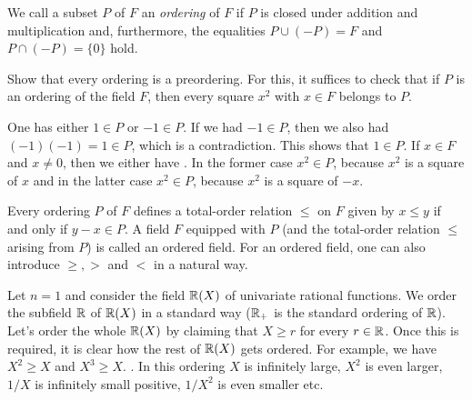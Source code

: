 We call a subset $P$ of $F$ an \emph{ordering} of $F$ if $P$ is closed under addition and multiplication and, furthermore, the equalities $P \cup (-P) = F$ and $P \cap (-P) = \{0\}$ hold. 

\begin{exercise}
\label{ex:ordering-preordering}
	Show that every ordering is a preordering. For this, it suffices to check that if $P$ is an ordering of the field $F$, then every square $x^2$ with $x \in F$ belongs to $P$.
\end{exercise} 
\begin{solution}
	One has either $1 \in P$ or $-1 \in P$. If we had $-1 \in P$, then we also had $(-1) (-1) = 1 \in P$, which is a contradiction. This shows that $1 \in P$. If $x \in F$ and $x \ne 0$, then we either have . In the former case $x^2 \in P$, because $x^2$ is a square of $x$ and in the latter case $x^2 \in P$, because $x^2$ is a square of $-x$. 
\end{solution}

Every ordering $P$ of $F$ defines a total-order relation $\le$ on $F$ given by $x \le y $ if and only if $y -x \in P$.  A field $F$ equipped with $P$ (and the total-order relation $\le$ arising from $P$) is called an ordered field. For an ordered field, one can also introduce $\ge, >$ and $<$ in a natural way. 

\begin{example}
	\label{ex:ordering:rational:functions}
	Let $n=1$ and consider the field $\mathbb{R}(X)$ of univariate rational functions. We order the subfield $\mathbb{R}$ of $\mathbb{R}(X)$ in a standard way ($\mathbb{R}_+$ is the standard ordering of $\mathbb{R}$). Let's order the whole $\mathbb{R}(X)$ by claiming that $X \ge r$ for every $r \in \mathbb{R}$. Once this is required, it is clear how the rest of $\mathbb{R}(X)$ gets ordered. For example, we have $X^2 \ge X$ and $X^3 \ge X$.
	. In this ordering $X$ is infinitely large, $X^2$ is even larger, $1/X$ is infinitely small positive, $1/X^2$ is even smaller etc. 
\end{example}

